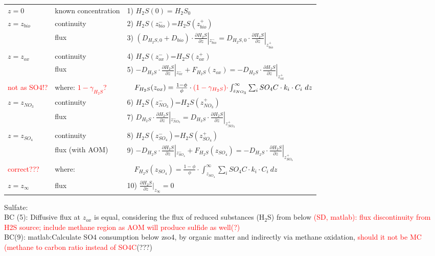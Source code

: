 \documentclass[gmd, manuscript]{copernicus}
\begin{document}
\begin{table}[tbp]
\begin{tabular}{ |l| l| l|}
\hline
$z=0$& known concentration& 1) $H_2S(0)=H_2S_{0}$  \\
$z=z_{bio}$&continuity& 2) $H_2S(z_{bio}^-)$=$H_2S(z_{bio}^+)$\\
               & flux & 3) $\left(D_{H_2S,0}+D_{bio}\right )\cdot \frac{\partial H_2S}{\partial z}|_{z_{bio}^-}=D_{H_2S,0} \cdot \frac{\partial H_2S}{\partial z}|_{z_{bio}^+}$\\
$z=z_{ox}$& continuity& 4) $H_2S(z_{ox}^-)$=$H_2S(z_{ox}^+)$\\
               & flux & 5) $-D_{H_2S} \cdot \frac{\partial H_2S}{\partial z}|_{z_{ox}^-} +  F_{H_2S}(z_{ox})=-D_{H_2S} \cdot \frac{\partial H_2S}{\partial z}|_{z_{ox}^+}$\\
\textcolor{red}{not as SO4!?}&where: \textcolor{red}{$1-\gamma_{H_2S}$?} & $\quad F_{H_2S}(z_{ox})=\frac{1-\phi}{\phi} \cdot \textcolor{red}{(1-\gamma_{H_2S})\cdot} \int_{z_{NO_3}}^{\infty}  \sum_i SO_4C \cdot k_i \cdot C_i\ dz$ \\          
$z=z_{NO_3}$&continuity& 6) $H_2S(z_{NO_3}^-)$=$H_2S(z_{NO_3}^+)$\\
               & flux & 7) $D_{H_2S}\cdot \frac{\partial H_2S}{\partial z}|_{z_{NO_3}^-}=D_{H_2S} \cdot \frac{\partial H_2S}{\partial z}|_{z_{NO_3}^+}$\\
$z=z_{SO_4}$& continuity & 8) $H_2S(z_{SO_4}^-)$=$H_2S(z_{SO_4}^+)$\\ %
               & flux (with AOM) & 9)  $-D_{H_2S}\cdot \frac{\partial H_2S}{\partial z}|_{z_{SO_4}^-} +  F_{H_2S}(z_{SO_4})=-D_{H_2S} \cdot \frac{\partial H_2S}{\partial z}|_{z_{SO_4}^+}$\\
\textcolor{red}{correct???}&where: & $\quad F_{H_2S}(z_{SO_4})=\frac{1-\phi}{\phi} \cdot \int_{z_{SO_4}}^{\infty}  \sum_i SO_4C \cdot k_i \cdot C_i\ dz$ \\          
$z=z_{\infty}$& flux & 10) $\frac{\partial H_2S}{\partial z}|_{z_\infty}=0$\\
\hline    
\end{tabular}
\label{Tab:BC_SO4+H2S}
\end{table}
Sulfate:\\
BC (5): Diffusive flux at $z_{ox}$ is equal, considering the flux of reduced substances (H$_2$S) from below 
\textcolor{red}{(SD, matlab): flux discontinuity from H2S source; include methane region as AOM will produce sulfide as well(?)} \\
BC(9): matlab:Calculate SO4 consumption below zso4, by organic matter and indirectly via methane oxidation, \textcolor{red}{should it not be MC (methane to carbon ratio instead of SO4C}(???) \\
\end{document}
